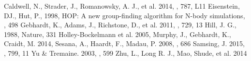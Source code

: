 \documentclass{aastex62}
\begin{document}
\begin{thebibliography}{}
Caldwell, N., Strader, J., Romanowsky, A. J., et al. 2014, \apjl, 787, L11
Eisenstein, DJ., Hut, P., 1998, HOP: A new group-finding algorithm for N-body simulations, \apj, 498
Gebhardt, K., Adams, J., Richstone, D., et al. 2011, \apj, 729, 13
Hill, J. G., 1988, Nature, 331
Holley-Bockelmann et al. 2005, \apjl
{}
Murphy, J., Gebhardt, K., Craidt, M. 2014, \apj
{}
Sesana, A., Haardt, F., Madau, P. 2008, \apj, 686
Samsing, J. 2015, \apj, 799, 11
Yu \& Tremaine. 2003, \apj, 599
Zhu, L., Long R. J., Mao, Shude, et al. 2014 \apj
\end{thebibliography}
\end{document}
